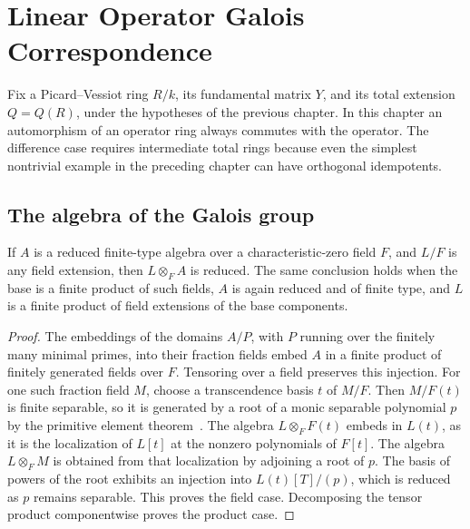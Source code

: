 \chapter{Linear Operator Galois Correspondence}

Fix a Picard--Vessiot ring \(R/k\), its fundamental matrix \(Y\),
and its total extension \(Q=Q(R)\), under the hypotheses of the
previous chapter. In this chapter an automorphism of an operator
ring always commutes with the operator. The difference case requires
intermediate total rings because even the simplest nontrivial
example in the preceding chapter can have orthogonal idempotents.

\section{The algebra of the Galois group}

\begin{lemma}
\label{res:PV11}
If \(A\) is a reduced finite-type algebra over a characteristic-zero
field \(F\), and \(L/F\) is any field extension, then
\(L\otimes_F A\) is reduced. The same conclusion holds when the base
is a finite product of such fields, \(A\) is again reduced and
of finite type, and \(L\) is a finite product of field extensions
of the base components.
\end{lemma}

\begin{proof}
The embeddings of the domains \(A/P\), with \(P\) running over the
finitely many minimal primes, into their fraction fields embed \(A\)
in a finite product of finitely generated fields over \(F\).
Tensoring over a field preserves this injection. For one such
fraction field \(M\), choose a transcendence basis \(t\) of
\(M/F\). Then \(M/F(t)\) is finite separable, so it is generated
by a root of a monic separable polynomial \(p\) by the primitive
element theorem~\cite[Section 14.31, PDF p.~113]{mg-d07}. The algebra
\(L\otimes_F F(t)\) embeds in \(L(t)\), as it is the localization
of \(L[t]\) at the nonzero polynomials of \(F[t]\).
The algebra \(L\otimes_F M\) is obtained from that localization
by adjoining a root of \(p\). The basis of powers of the root
exhibits an injection into \(L(t)[T]/(p)\), which is reduced
as \(p\) remains separable. This proves the field case. Decomposing
the tensor product componentwise proves the product case.
\end{proof}

